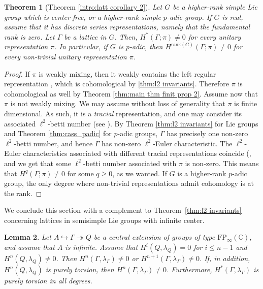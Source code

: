 \documentclass[12pt,reqno]{amsart}
\newcommand{\C}{\mathbb{C}}
\newtheorem{theorem}{Theorem}[section]
\newtheorem{lemma}[theorem]{Lemma}
\theoremstyle{definition}
\begin{document}
\begin{theorem}[Theorem \ref{intro:latt corollary 2}]
    Let $G$ be a higher-rank simple Lie group which is center free, or a higher-rank simple $p$-adic group. If $G$ is real, assume that it has discrete series representations, namely that the fundamental rank is zero. Let $\Gamma$ be a lattice in $G$. Then, $H^*(\Gamma;\pi) \ne 0$ for every unitary representation $\pi$. In particular, if $G$ is $p$-adic, then $H^{\mathrm{rank}(G)}(\Gamma;\pi)\ne 0$ for every  non-trivial unitary representation $\pi$.
\end{theorem}
\begin{proof}
    If $\pi$ is weakly mixing, then it  weakly contains the left regular representation \cite[Corollary~D]{BoutHoud}, which is cohomological by \ref{thm:l2 invariants}. Therefore $\pi$ is cohomological as well by Theorem \ref{thm:main thm finit prop 2}. Assume now that $\pi$ is not weakly mixing. We may assume without loss of generality that $\pi$ is finite dimensional. As such, it is a \emph{tracial} representation, and one may consider its associated $\ell^2$-betti number (see \cite[Definition~3.3]{FournierFacioSauer}). By Theorem \ref{thm:l2 invariants} for Lie groups and Theorem \ref{thm:cass_padic} for $p$-adic groups, $\Gamma$ has precisely one non-zero $\ell^2$-betti number, and hence $\Gamma$ has non-zero $\ell^2$-Euler characteristic. The $\ell^2$-Euler characteristics associated with different tracial representations coincide (\cite[Proposition~3.5]{FournierFacioSauer}, and we get that some $\ell^2$-betti number associated with $\pi$ is non-zero. This means that $H^q(\Gamma;\pi)\ne 0$ for some $q \geq 0$, as we wanted. If $G$ is a higher-rank $p$-adic group, the only degree where non-trivial representations admit cohomology is at the rank.
\end{proof}

We conclude this section with a complement to Theorem~\ref{thm:l2 invariants} concerning lattices in semisimple Lie groups with infinite center. 

\begin{lemma}\label{lem: non-Hausdorff for amenable central subgroups}
Let $A\hookrightarrow \Gamma\twoheadrightarrow Q$ be a central extension of groups of type $\mathrm{FP}_\infty(\C)$, and assume that $A$ is infinite. 
Assume that $H^i(Q, \lambda_Q)=0$ for $i\le n-1$ and $H^{n}(Q,\lambda_Q)\ne 0$. 
Then $H^{n}(\Gamma, \lambda_\Gamma)\ne 0$ or $H^{n+1}(\Gamma, \lambda_\Gamma)\ne 0$. If, in addition, $H^n(Q, \lambda_Q)$ is purely torsion, then $H^{n}(\Gamma, \lambda_\Gamma)\ne 0$. 
Furthermore, $H^\ast(\Gamma, \lambda_\Gamma)$ is purely torsion in all degrees. 
\end{lemma}
\end{document}
